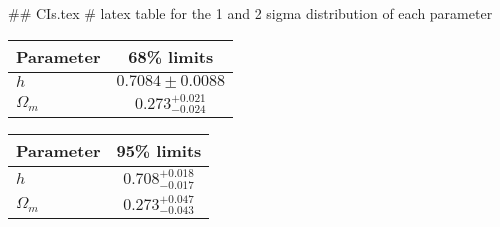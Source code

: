 ## CIs.tex
# latex table for the 1 and 2 sigma distribution of each parameter

\begin{tabular} { l  c}
 Parameter &  68\% limits\\
\hline
{\boldmath$h              $} & $0.7084\pm 0.0088          $\\
{\boldmath$\Omega_m       $} & $0.273^{+0.021}_{-0.024}   $\\
\hline
\end{tabular}

\begin{tabular} { l  c}
 Parameter &  95\% limits\\
\hline
{\boldmath$h              $} & $0.708^{+0.018}_{-0.017}   $\\
{\boldmath$\Omega_m       $} & $0.273^{+0.047}_{-0.043}   $\\
\hline
\end{tabular}
